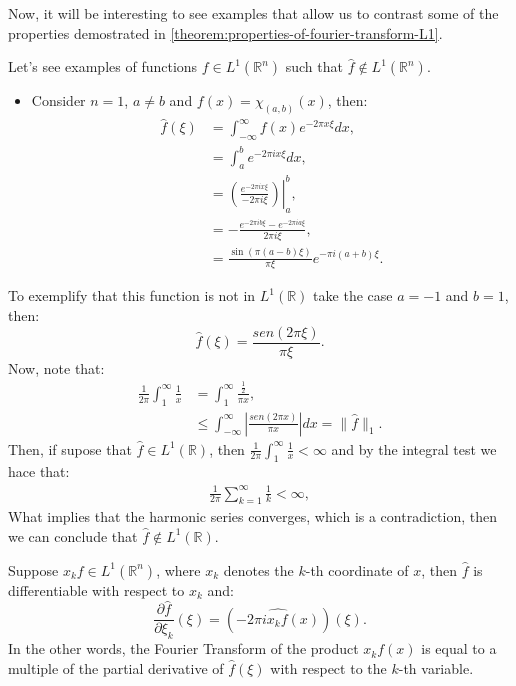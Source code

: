 Now, it will be interesting to see examples that allow us to contrast some of the properties demostrated in \cref{theorem:properties-of-fourier-transform-L1}.
\begin{example}{}\label{example:f-in-l1-but-f-transform-not}
  Let's see examples of functions $f\in L^{1}(\mathbb{R}^n)$ such that $\hat{f}\notin L^{1}(\mathbb{R}^n)$.
  \begin{itemize}
  	\item Consider $n=1$, $a\neq b$ and $f(x)=\chi_{(a,b)}(x)$, then:
  	\begin{align*}
  		\hat{f}(\xi)&=\int_{-\infty}^{\infty}f(x)e^{-2\pi x\xi}dx,\\
  		&=\int_{a}^{b}e^{-2\pi i x\xi}dx,\\
  		&=\left. \left(\frac{e^{-2\pi ix\xi}}{-2\pi i\xi}\right) \right|_{a}^{b},\\
  		&=-\frac{e^{-2\pi ib\xi}-e^{-2\pi ia\xi}}{2\pi i\xi},\\
  		&=\frac{\sin(\pi(a-b)\xi)}{\pi\xi}e^{-\pi i (a+b)\xi}.
  	\end{align*}
  \end{itemize}
  To exemplify that this function is not in $L^{1}(\mathbb{R})$ take the case $a=-1$ and $b=1$, then:
  $$\hat{f}(\xi)=\frac{sen(2\pi \xi)}{\pi \xi}.$$
  Now, note that:
  \begin{align*}
  	\frac{1}{2 \pi}\int_{1}^{\infty}\frac{1}{x}&=\int_{1}^{\infty}\frac{\frac{1}{2}}{\pi x},\\
  	&\leq \int_{-\infty}^{\infty}\left|\frac{sen(2\pi x)}{\pi x}\right|dx=\|\hat{f}\|_1.
  \end{align*}
  Then, if supose that $\hat{f}\in L^{1}(\mathbb{R})$, then $\frac{1}{2 \pi}\int_{1}^{\infty}\frac{1}{x}< \infty$ and by the integral test we hace that:
  \begin{align*}
  	\frac{1}{2 \pi}\sum_{k=1}^{\infty}\frac{1}{k}<\infty,
  \end{align*}
  What implies that the harmonic series converges, which is a contradiction, then we can conclude that $\hat{f}\notin L^{1}(\mathbb{R})$.  
\end{example}
\begin{proposition}{}
  Suppose $x_kf\in L^{1}(\mathbb{R}^n)$, where $x_k$ denotes the $k$-th coordinate of $x$, then $\hat{f}$ is differentiable with respect to $x_k$ and:
  \begin{equation}
    \frac{\partial \hat{f}}{\partial \xi_k}(\xi)=(\widehat{-2\pi i x_k f(x)})(\xi)\label{eq:2-8}.
  \end{equation}
  In the other words, the Fourier Transform of the product $x_k f(x)$ is equal to a multiple of the partial derivative of $\hat{f}(\xi)$ with respect to the $k$-th variable. 
\end{proposition}
